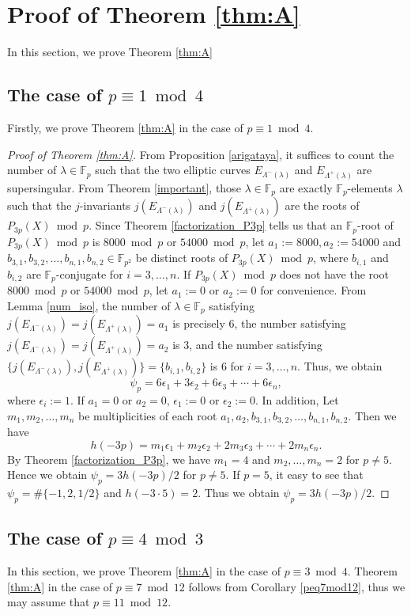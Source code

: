 \documentclass[a4paper, 11pt]{article}
\theoremstyle{plain}
\newcommand{\?}{\textcolor{red}{??}}
\newcommand{\lm}{\lambda}
\newcommand{\Lm}{\Lambda}
\newcommand{\fp}{\mathbb{F}_p}
\newcommand{\fpp}{\mathbb{F}_{p^2}}
\begin{document}
\section{Proof of Theorem \ref{thm:A} }
\label{pfofa}
In this section, we prove Theorem \ref{thm:A}
\subsection{The case of $p \equiv 1 \bmod 4 $ }

Firstly, we prove Theorem \ref{thm:A} in the case of $p \equiv1 \bmod4$.
\begin{proof}[Proof of Theorem \ref{thm:A}]
From Proposition \ref{arigataya}, it suffices to count the number of $\lm \in \fp$ such that the two elliptic curves $E_{\Lm^{-}(\lm)}$ and $E_{\Lm^{+}(\lm)}$ are supersingular. From Theorem \ref{important}, those $\lm\in \fp$ are exactly $\fp$-elements $\lm$ such that the $j$-invariants $j(E_{\Lm^{-}(\lm)})$ and $j(E_{\Lm^{+}(\lm)})$ are the roots of $P_{3p}(X) \bmod p$. Since Theorem \ref{factorization_P3p} tells us that an $\fp$-root of $P_{3p}(X) \bmod p$ is $8000 \bmod p$ or $54000 \bmod p$, let $a_1:=8000, a_2:=54000$ and $b_{3,1},b_{3,2},\ldots, b_{n,1}, b_{n,2}\in \fpp$ be distinct roots of $P_{3p}(X) \bmod p$, where $b_{i,1}$ and $b_{i,2}$ are $\fp$-conjugate for $i=3,\ldots,n$. If $P_{3p}(X) \bmod p$ does not have the root $8000 \bmod p$ or $54000 \bmod p$, let $a_1:=0$ or $a_2:=0$ for convenience.  From Lemma \ref{num_iso}, the number of $\lm \in \fp$ satisfying $j(E_{\Lm^{-}(\lm)})=j(E_{\Lm^{+}(\lm)})=a_1$ is precisely $6$, the number satisfying $j(E_{\Lm^{-}(\lm)})=j(E_{\Lm^{+}(\lm)})=a_2$ is $3$, and the number satisfying $\{j(E_{\Lm^{-}(\lm)}),j(E_{\Lm^{+}(\lm)})\}=\{b_{i,1},b_{i,2}\}$ is $6$ for $i=3, \ldots, n$. Thus, we obtain
\[
\psi_p=6\epsilon_1+3\epsilon_2+6\epsilon_3+\cdots+6\epsilon_n,
\]
where $\epsilon_i:=1$. If $a_1=0$ or $a_2=0$, $\epsilon_1:=0$ or $\epsilon_2:=0$. 
In addition, Let $m_1,m_2,\ldots, m_n$ be multiplicities of each root $a_1,a_2,b_{3,1},b_{3,2},\ldots ,b_{n,1}, b_{n,2}$. Then we have
\[
h(-3p)=m_1\epsilon_1+m_2\epsilon_2+2m_3\epsilon_3+\cdots+2m_n\epsilon_n.
\]
By Theorem \ref{factorization_P3p}, we have $m_1=4$ and $m_2,\ldots ,m_n=2$ for $p\ne 5$. Hence we obtain $\psi_p=3h(-3p)/2$ for $p \ne 5$. If $p=5$, it easy to see that $\psi_p=\#\{-1,2,1/2\}$ and $h(-3\cdot 5)=2$. Thus we obtain $\psi_p=3h(-3p)/2$.
\end{proof}

\subsection{The case of $p \equiv 4 \bmod 3 $ }
In this section, we prove Theorem \ref{thm:A} in the case of $p\equiv3 \bmod 4$. Theorem \ref{thm:A} in the case of $p \equiv7 \bmod 12$ follows from Corollary \ref{peq7mod12}, thus we may assume that $p \equiv11 \bmod 12$.
\end{document}
